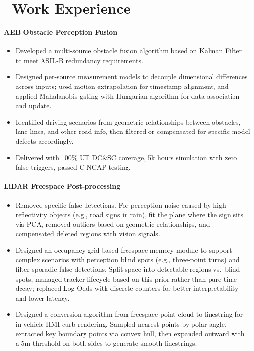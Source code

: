 \section{\faUsers\ Work Experience}


\paragraph{AEB Obstacle Perception Fusion}
\begin{itemize}
      \item Developed a multi-source obstacle fusion algorithm based on Kalman Filter to meet ASIL-B redundancy requirements.
      \item Designed per-source measurement models to decouple dimensional differences across inputs;
            used motion extrapolation for timestamp alignment,
            and applied Mahalanobis gating with Hungarian algorithm for data association and update.
      \item Identified driving scenarios from geometric relationships between obstacles, lane lines, and other road info,
            then filtered or compensated for specific model defects accordingly.
      \item Delivered with 100\% UT DC\&SC coverage, 5k hours simulation with zero false triggers, passed C-NCAP testing.
\end{itemize}

\paragraph{LiDAR Freespace Post-processing}
\begin{itemize}
      \item Removed specific false detections.
            For perception noise caused by high-reflectivity objects (e.g., road signs in rain),
            fit the plane where the sign sits via PCA,
            removed outliers based on geometric relationships,
            and compensated deleted regions with vision signals.
      \item Designed an occupancy-grid-based freespace memory module
            to support complex scenarios with perception blind spots (e.g., three-point turns) and filter sporadic false detections.
            Split space into detectable regions vs.\ blind spots, managed tracker lifecycle based on this prior rather than pure time decay;
            replaced Log-Odds with discrete counters for better interpretability and lower latency.
      \item Designed a conversion algorithm from freespace point cloud to linestring for in-vehicle HMI curb rendering.
            Sampled nearest points by polar angle, extracted key boundary points via convex hull,
            then expanded outward with a 5m threshold on both sides to generate smooth linestrings.
\end{itemize}

